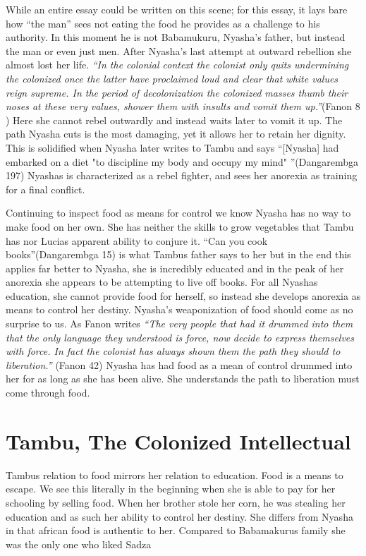 \documentclass{article}
\begin{document}
While an entire essay could be written on this scene; for this essay, it lays bare how ``the man'' sees not eating the food he provides as a challenge to his authority. In this moment he is not Babamukuru, Nyasha's father, but instead the man or even just men. After Nyasha's last attempt at outward rebellion she almost lost her life. \textit{``In the colonial context the colonist only quits undermining the colonized once the latter have proclaimed loud and clear that white values reign supreme. In the period of decolonization the colonized masses thumb their noses at these very values, shower them with insults and vomit them up.''}(Fanon 8 ) Here she cannot rebel outwardly and instead waits later to vomit it up. The path Nyasha cuts is the most damaging, yet it allows her to retain her dignity. This is solidified when Nyasha later writes to Tambu and says ``[Nyasha] had embarked on a diet "to discipline my body and occupy my mind" ''(Dangarembga 197) Nyashas is characterized as a rebel fighter, and sees her anorexia as training for a final conflict. 

Continuing to inspect food as means for control we know Nyasha has no way to make food on her own. She has neither the skills to grow vegetables that Tambu has nor Lucias apparent ability to conjure it. ``Can you cook books''(Dangarembga 15) is what Tambus father says to her but in the end this applies far better to Nyasha, she is incredibly educated and in the peak of her anorexia she appears to be attempting to live off books. For all Nyashas education, she cannot provide food for herself, so instead she develops anorexia as means to control her destiny. Nyasha's weaponization of food should come as no surprise to us. As Fanon writes \textit{``The very people that had it drummed into them that the only language they understood is force, now decide to express themselves with force. In fact the colonist has always shown them the path they should to liberation.''} (Fanon 42) Nyasha has had food as a mean of control drummed into her for as long as she has been alive. She understands the path to liberation must come through food. 


\section*{ Tambu, The Colonized Intellectual}
Tambus relation to food mirrors her relation to education. Food is a means to escape. We see this literally in the beginning when she is able to pay for her schooling by selling food. When her brother stole her corn, he was stealing her education and as such her ability to control her destiny. She differs from Nyasha in that african food is authentic to her. Compared to Babamakurus family she was the only one who liked Sadza 
\end{document}
